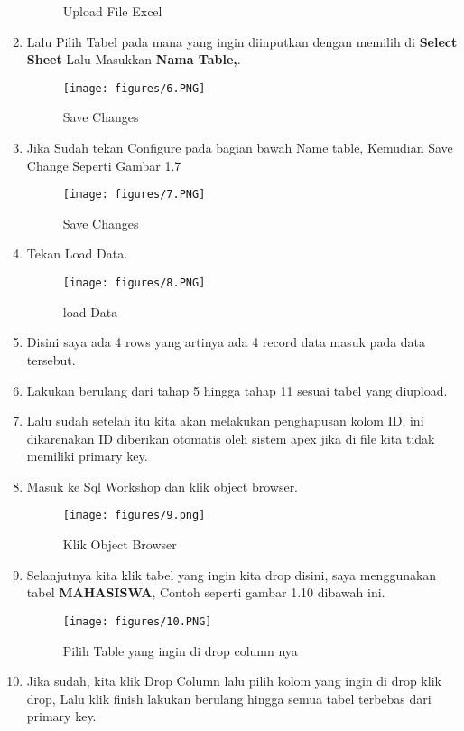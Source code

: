 \begin{enumerate}
\begin{figure}[!htbp]
\caption{Upload File Excel}
\label{penanda}
\end{figure}
\item Lalu Pilih Tabel pada mana yang ingin diinputkan dengan memilih di \textbf{Select Sheet} Lalu Masukkan \textbf{Nama Table,}.
\begin{figure}[!htbp]
\centering
\texttt{[image: figures/6.PNG]}
\caption{Save Changes}
\label{penanda}
\end{figure}
\item Jika Sudah tekan Configure pada bagian bawah Name table, Kemudian Save Change Seperti Gambar 1.7
\begin{figure}[!htbp]
\centering
\texttt{[image: figures/7.PNG]}
\caption{Save Changes}
\label{penanda}
\end{figure}
\item Tekan Load Data.
\begin{figure}[!htbp]
\centering
\texttt{[image: figures/8.PNG]}
\caption{load Data}
\label{penanda}
\end{figure} \vspace{6cm}
\item Disini saya ada 4 rows yang artinya ada 4 record data masuk pada data tersebut.
\item  Lakukan berulang dari tahap 5 hingga tahap 11 sesuai tabel yang diupload.
\item  Lalu sudah setelah itu kita akan melakukan penghapusan kolom ID, ini dikarenakan ID diberikan otomatis oleh sistem apex jika di file kita tidak memiliki primary key.
\item Masuk ke Sql Workshop dan klik object browser.
\begin{figure}[!htbp]
\centering
\texttt{[image: figures/9.png]}
\caption{Klik Object Browser}
\label{penanda}
\end{figure}\vspace{6cm}
\item Selanjutnya kita klik tabel yang ingin kita drop disini, saya menggunakan tabel \textbf{MAHASISWA}, Contoh seperti gambar 1.10 dibawah ini.
\begin{figure}[!htbp]
\centering
\texttt{[image: figures/10.PNG]}
\caption{Pilih Table yang ingin di drop column nya}
\label{penanda}
\end{figure}
\item Jika sudah, kita klik Drop Column lalu pilih kolom yang ingin di drop klik drop, Lalu klik finish lakukan berulang hingga semua tabel terbebas dari primary key.

\end{enumerate}

